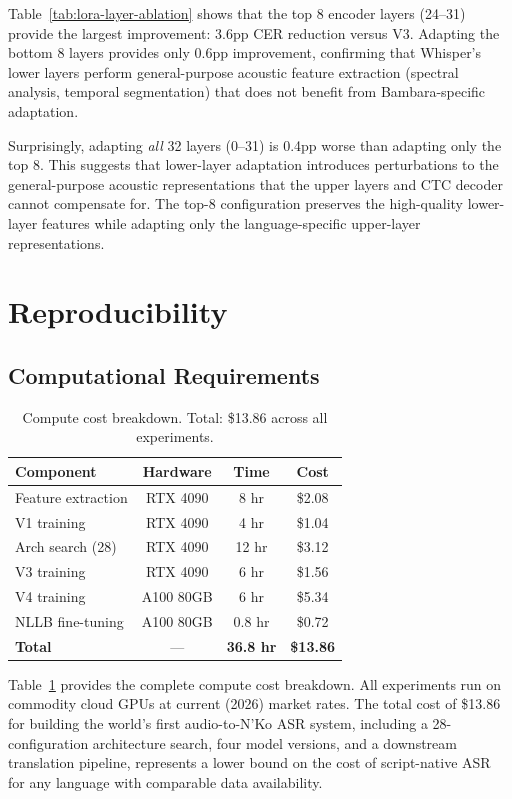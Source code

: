 \documentclass[11pt]{article}
\begin{document}
Table~\ref{tab:lora-layer-ablation} shows that the top 8 encoder layers (24--31) provide the largest improvement: 3.6pp CER reduction versus V3.
Adapting the bottom 8 layers provides only 0.6pp improvement, confirming that Whisper's lower layers perform general-purpose acoustic feature extraction (spectral analysis, temporal segmentation) that does not benefit from Bambara-specific adaptation.

Surprisingly, adapting \emph{all} 32 layers (0--31) is 0.4pp worse than adapting only the top 8.
This suggests that lower-layer adaptation introduces perturbations to the general-purpose acoustic representations that the upper layers and CTC decoder cannot compensate for.
The top-8 configuration preserves the high-quality lower-layer features while adapting only the language-specific upper-layer representations.

\section{Reproducibility}

\subsection{Computational Requirements}

\begin{table}[t]
\centering
\small
\begin{tabular}{lccc}
\toprule
\textbf{Component} & \textbf{Hardware} & \textbf{Time} & \textbf{Cost} \\
\midrule
Feature extraction & RTX 4090 & 8 hr & \$2.08 \\
V1 training & RTX 4090 & 4 hr & \$1.04 \\
Arch search (28) & RTX 4090 & 12 hr & \$3.12 \\
V3 training & RTX 4090 & 6 hr & \$1.56 \\
V4 training & A100 80GB & 6 hr & \$5.34 \\
NLLB fine-tuning & A100 80GB & 0.8 hr & \$0.72 \\
\midrule
\textbf{Total} & --- & \textbf{36.8 hr} & \textbf{\$13.86} \\
\bottomrule
\end{tabular}
\caption{Compute cost breakdown. Total: \$13.86 across all experiments.}
\label{tab:compute-cost}
\end{table}

Table~\ref{tab:compute-cost} provides the complete compute cost breakdown.
All experiments run on commodity cloud GPUs at current (2026) market rates.
The total cost of \$13.86 for building the world's first audio-to-N'Ko ASR system, including a 28-configuration architecture search, four model versions, and a downstream translation pipeline, represents a lower bound on the cost of script-native ASR for any language with comparable data availability.
\end{document}
